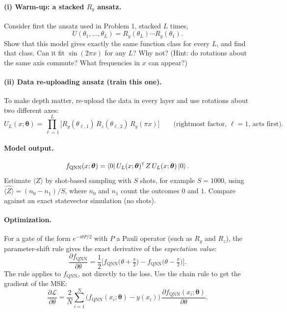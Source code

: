 \documentclass[11pt]{article}
\begin{document}
\paragraph{(i) Warm-up: a stacked $R_y$ ansatz.}
Consider first the ansatz used in Problem 1, stacked $L$ times,
\[
U(\theta_1,\ldots,\theta_L) = R_y(\theta_L)\cdots R_y(\theta_1).
\]
Show that this model gives exactly the same function class for every $L$, and find that class. Can it fit $\sin(2\pi x)$ for any $L$? Why not? (Hint: do rotations about the same axis commute? What frequencies in $x$ can appear?)

\paragraph{(ii) Data re-uploading ansatz (train this one).}
To make depth matter, re-upload the data in every layer and use rotations about two different axes:
\[
U_L(x;\boldsymbol{\theta})
=
\prod_{\ell=1}^{L}\Big[R_y(\theta_{\ell,1})\,R_z(\theta_{\ell,2})\,R_y(\pi x)\Big]
\qquad\text{(rightmost factor, $\ell=1$, acts first)}.
\]

\paragraph{Model output.}
\[
f_{\mathrm{QNN}}(x;\boldsymbol{\theta})
=
\bra{0}U_L(x;\boldsymbol{\theta})^\dagger\, Z\, U_L(x;\boldsymbol{\theta})\ket{0}.
\]
Estimate $\langle Z\rangle$ by shot-based sampling with $S$ shots, for example $S=1000$, using $\widehat{\langle Z\rangle}=(n_0-n_1)/S$, where $n_0$ and $n_1$ count the outcomes $0$ and $1$. Compare against an exact statevector simulation (no shots).

\paragraph{Optimization.}
For a gate of the form $e^{-i\theta P/2}$ with $P$ a Pauli operator (such as $R_y$ and $R_z$), the parameter-shift rule gives the exact derivative of the \emph{expectation value}:
\[
\frac{\partial f_{\mathrm{QNN}}}{\partial \theta}
=\frac{1}{2}\Big[f_{\mathrm{QNN}}\big(\theta+\tfrac{\pi}{2}\big)-f_{\mathrm{QNN}}\big(\theta-\tfrac{\pi}{2}\big)\Big].
\]
The rule applies to $f_{\mathrm{QNN}}$, not directly to the loss. Use the chain rule to get the gradient of the MSE:
\[
\frac{\partial \mathcal{L}}{\partial \theta}
=\frac{2}{N}\sum_{i=1}^{N}\big(f_{\mathrm{QNN}}(x_i;\boldsymbol{\theta})-y(x_i)\big)\,\frac{\partial f_{\mathrm{QNN}}(x_i;\boldsymbol{\theta})}{\partial \theta}.
\]
\end{document}
